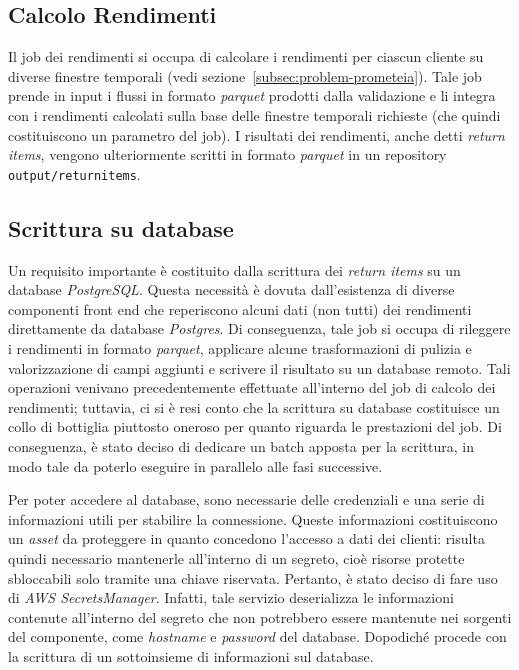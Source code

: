 \subsection{Calcolo Rendimenti}\label{subsec:etl-returns}
Il job dei rendimenti si occupa di calcolare i rendimenti per ciascun cliente su diverse finestre temporali (vedi sezione~\ref{subsec:problem-prometeia}).
Tale job prende in input i flussi in formato \textit{parquet} prodotti dalla validazione e li integra con i rendimenti calcolati sulla base delle finestre temporali richieste (che quindi costituiscono un parametro del job).
I risultati dei rendimenti, anche detti \textit{return items}, vengono ulteriormente scritti in formato \textit{parquet} in un repository \texttt{output/returnitems}.

\subsection{Scrittura su database}\label{subsec:etl-postgres}
Un requisito importante è costituito dalla scrittura dei \textit{return items} su un database \textit{PostgreSQL}.
Questa necessità è dovuta dall'esistenza di diverse componenti front end che reperiscono alcuni dati (non tutti) dei rendimenti direttamente da database \textit{Postgres}.
Di conseguenza, tale job si occupa di rileggere i rendimenti in formato \textit{parquet}, applicare alcune trasformazioni di pulizia e valorizzazione di campi aggiunti e scrivere il risultato su un database remoto.
Tali operazioni venivano precedentemente effettuate all'interno del job di calcolo dei rendimenti;
tuttavia, ci si è resi conto che la scrittura su database costituisce un collo di bottiglia piuttosto oneroso per quanto riguarda le prestazioni del job.
Di conseguenza, è stato deciso di dedicare un batch apposta per la scrittura, in modo tale da poterlo eseguire in parallelo alle fasi successive.

Per poter accedere al database, sono necessarie delle credenziali e una serie di informazioni utili per stabilire la connessione.
Queste informazioni costituiscono un \textit{asset} da proteggere in quanto concedono l'accesso a dati dei clienti:
risulta quindi necessario mantenerle all'interno di un segreto, cioè risorse protette sbloccabili solo tramite una chiave riservata.
Pertanto, è stato deciso di fare uso di \textit{AWS SecretsManager}.
Infatti, tale servizio deserializza le informazioni contenute all'interno del segreto che non potrebbero essere mantenute nei sorgenti del componente, come \textit{hostname} e \textit{password} del database.
Dopodiché procede con la scrittura di un sottoinsieme di informazioni sul database.


